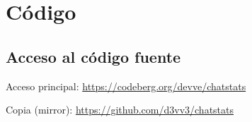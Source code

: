 \chapter{Código} \label{chap:code}

\section{Acceso al código fuente}

Acceso principal: \url{https://codeberg.org/devve/chatstats}

Copia (mirror): \url{https://github.com/d3vv3/chatstats}

